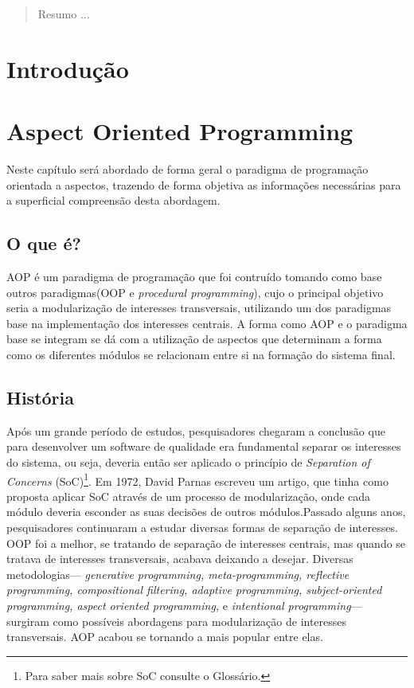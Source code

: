 \documentclass[tc,openright]{iiufrgs}
\begin{document}
\listoffigures

\listoftables

\begin{abstract}

Resumo ...

\end{abstract}

\chapter{Introdução}

\chapter{Aspect Oriented Programming}

Neste capítulo será abordado de forma geral o paradigma de programação orientada a aspectos, trazendo de forma objetiva as informações necessárias para a superficial compreensão desta abordagem.
\section{O que é?}
AOP é um paradigma de programação que foi contruído tomando como base outros paradigmas(OOP e \textit{procedural programming}), cujo o principal objetivo seria a modularização de interesses transversais, utilizando um dos paradigmas base na implementação dos interesses centrais. A forma como AOP e o paradigma base se integram se dá com a utilização de aspectos que determinam a forma como os diferentes módulos se relacionam entre si na formação do sistema final. \cite{laddad2003aspectj}

\section{História}
Após um grande período de estudos, pesquisadores chegaram a conclusão que para desenvolver um software de qualidade era fundamental separar os interesses do sistema, ou seja, deveria então ser aplicado o princípio de \textit{Separation of Concerns} (SoC)\footnote{Para saber mais sobre SoC consulte o Glossário.}. Em 1972, David Parnas escreveu um artigo, que tinha como  proposta aplicar SoC através de um processo de modularização, onde cada módulo deveria esconder as suas decisões de outros módulos.Passado alguns anos, pesquisadores continuaram a estudar diversas formas de separação de interesses. OOP foi a melhor, se tratando de separação de interesses centrais, mas quando se tratava de interesses transversais, acabava deixando a desejar. Diversas metodologias— \textit{generative programming, meta-programming, reflective programming, compositional filtering, adaptive programming, subject-oriented programming, aspect oriented programming,} e  \textit{intentional programming}— surgiram como possíveis abordagens para modularização de interesses transversais. AOP acabou se tornando a mais popular entre elas. \cite{laddad2003aspectj}
\end{document}
